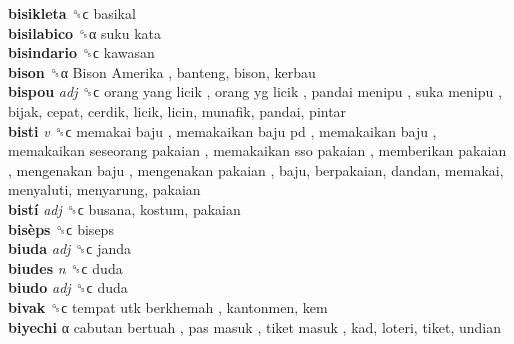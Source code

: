 \textbf{bisikleta} ␝ϲ  basikal  \\
\textbf{bisilabico} ␝α   suku kata   \\
\textbf{bisindario} ␝ϲ  kawasan  \\
\textbf{bison} ␝α   Bison Amerika , banteng, bison, kerbau  \\
\textbf{bispou} \emph{adj}  ␝ϲ   orang yang licik ,  orang yg licik ,  pandai menipu ,  suka menipu , bijak, cepat, cerdik, licik, licin, munafik, pandai, pintar  \\
\textbf{bisti} \emph{v}  ␝ϲ   memakai baju ,  memakaikan baju pd ,  memakaikan baju ,  memakaikan seseorang pakaian ,  memakaikan sso pakaian ,  memberikan pakaian ,  mengenakan baju ,  mengenakan pakaian , baju, berpakaian, dandan, memakai, menyaluti, menyarung, pakaian  \\
\textbf{bistí} \emph{adj}  ␝ϲ  busana, kostum, pakaian  \\
\textbf{bisèps} ␝ϲ  biseps  \\
\textbf{biuda} \emph{adj}  ␝ϲ  janda  \\
\textbf{biudes} \emph{n}  ␝ϲ  duda  \\
\textbf{biudo} \emph{adj}  ␝ϲ  duda  \\
\textbf{bivak} ␝ϲ   tempat utk berkhemah , kantonmen, kem  \\
\textbf{biyechi} α   cabutan bertuah ,  pas masuk ,  tiket masuk , kad, loteri, tiket, undian  \\
